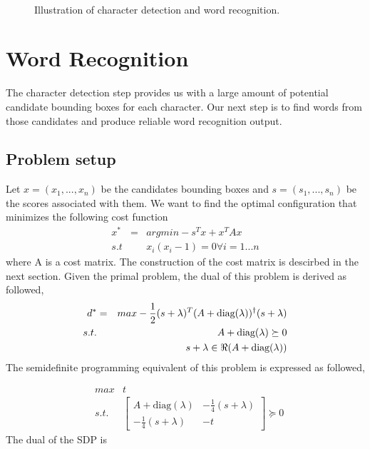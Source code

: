 \documentclass[10pt,twocolumn,letterpaper]{article}
\begin{document}
\begin{figure}[ht]
\begin{center}$
\begin{array}{cc}
\end{array}$
\end{center}
\caption{Illustration of character detection and word recognition.}
\label{figure:end-to-end}
\end{figure}

\section{Word Recognition}

The character detection step provides us with a large amount of potential candidate bounding boxes for each character. Our next step is to find words from those candidates and produce reliable word recognition output.

\subsection{Problem setup}

Let $x=(x_{1},...,x_{n})$ be the candidates bounding boxes and $s=(s_{1},...,s_{n})$
be the scores associated with them. We want to find the optimal configuration
that minimizes the following cost function
\begin{eqnarray*}
x^{*} & = & argmin-s^{T}x+x^{T}Ax\\
s.t &  & x_{i}(x_{i}-1)=0\forall i=1...n
\end{eqnarray*}
where A is a cost matrix. The construction of the cost matrix is descirbed in the next section. Given the primal problem, the dual of this problem is derived as followed,
\begin{eqnarray*}
d^{*} & = & max-\frac{1}{2}(s+\lambda)^{T}(A+\mbox{diag}(\lambda))^{\dagger}(s+\lambda)\\
s.t. &  & A+\mbox{diag}(\lambda)\succeq0\\
 &  & s+\lambda\in\Re(A+\mbox{diag(\ensuremath{\lambda}))}
\end{eqnarray*}
The semidefinite programming equivalent of this problem is expressed as followed,

\begin{eqnarray*}
& max & t\\
 & s.t. & \left[\begin{array}{cc}
A+\mbox{diag}(\lambda) & -\frac{1}{4}(s+\lambda)\\
-\frac{1}{4}(s+\lambda) & -t
\end{array}\right]\succeq0
\end{eqnarray*}
The dual of the SDP is
\end{document}
